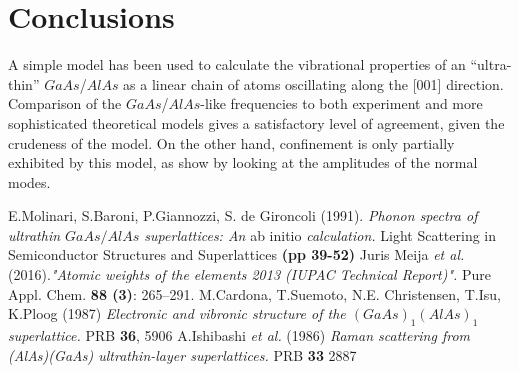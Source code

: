 \documentclass{article}
\begin{document}
\newpage
\section*{Conclusions}
A simple model has been used to calculate the vibrational properties of an “ultra-thin” $GaAs$/$AlAs$ as a linear chain of atoms oscillating along the [001] direction.\\
Comparison of the $GaAs$/$AlAs$-like frequencies to both experiment and more sophisticated theoretical models gives a satisfactory level of agreement, given the crudeness of the model. On the other hand, confinement is only partially exhibited by this model, as show by looking at the amplitudes of the normal modes.

\appendix
\newpage
\begin{thebibliography}{9}
		E.Molinari, S.Baroni, P.Giannozzi, S. de Gironcoli (1991).
		\emph{Phonon spectra of ultrathin $GaAs/AlAs$ superlattices: An} ab initio \emph{calculation.} {\color{Burgundy} Light Scattering in Semiconductor Structures and Superlattices \textbf{(pp 39-52)}}
		Juris Meija \emph{et al.} (2016).\emph{"Atomic weights of the elements 2013 (IUPAC Technical Report)".} {\color{Burgundy} Pure Appl. Chem. \textbf{88 (3)}: 265–291.}
		M.Cardona, T.Suemoto, N.E. Christensen, T.Isu, K.Ploog (1987)
		\emph{Electronic and vibronic structure of the $(GaAs)_1(AlAs)_1$ superlattice.} {\color{Burgundy} PRB \textbf{36}, 5906}
		A.Ishibashi \emph{et al.} (1986)
		\emph{Raman scattering from (AlAs)(GaAs) ultrathin-layer superlattices.} {\color{Burgundy} PRB \textbf{33} 2887}
\end{thebibliography}
\end{document}

